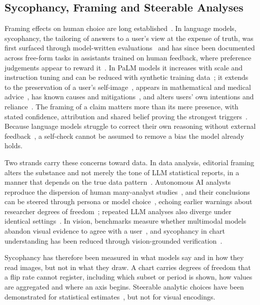 \documentclass[conference]{IEEEtran}
\begin{document}
\subsection{Sycophancy, Framing and Steerable Analyses}

Framing effects on human choice are long established~\cite{tversky1981}. In language models, sycophancy, the tailoring of answers to a user's view at the expense of truth, was first surfaced through model-written evaluations~\cite{perez2023} and has since been documented across free-form tasks in assistants trained on human feedback, where preference judgements appear to reward it~\cite{sharma2023sycophancy}. In PaLM models it increases with scale and instruction tuning and can be reduced with synthetic training data~\cite{wei2023}; it extends to the preservation of a user's self-image~\cite{cheng2025}, appears in mathematical and medical advice~\cite{fanous2025}, has known causes and mitigations~\cite{malmqvist2024}, and alters users' own intentions and reliance~\cite{cheng2026}. The framing of a claim matters more than its mere presence, with stated confidence, attribution and shared belief proving the strongest triggers~\cite{seo2026}. Because language models struggle to correct their own reasoning without external feedback~\cite{huang2024}, a self-check cannot be assumed to remove a bias the model already holds.

Two strands carry these concerns toward data. In data analysis, editorial framing alters the substance and not merely the tone of LLM statistical reports, in a manner that depends on the true data pattern~\cite{balani2026}. Autonomous AI analysts reproduce the dispersion of human many-analyst studies~\cite{silberzahn2018}, and their conclusions can be steered through persona or model choice~\cite{bertran2026}, echoing earlier warnings about researcher degrees of freedom~\cite{simmons2011}; repeated LLM analyses also diverge under identical settings~\cite{cui2026}. In vision, benchmarks measure whether multimodal models abandon visual evidence to agree with a user~\cite{hong2026,li2024,rahman2025}, and sycophancy in chart understanding has been reduced through vision-grounded verification~\cite{wang2026}.

Sycophancy has therefore been measured in what models say and in how they read images, but not in what they draw. A chart carries degrees of freedom that a flip rate cannot register, including which subset or period is shown, how values are aggregated and where an axis begins. Steerable analytic choices have been demonstrated for statistical estimates~\cite{bertran2026}, but not for visual encodings.
\end{document}
